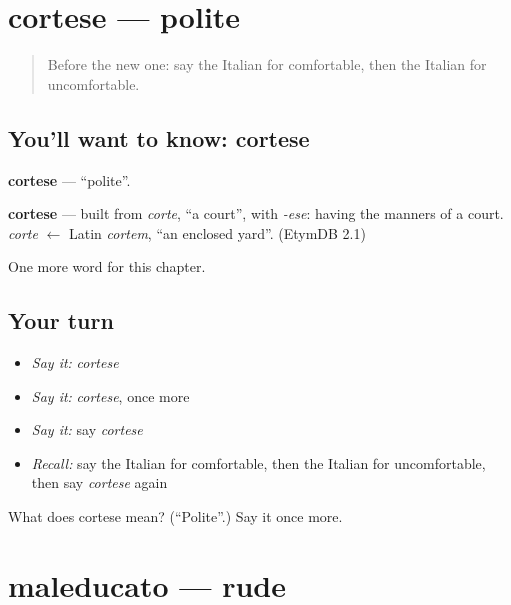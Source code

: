 \section[cortese]{cortese — polite}

\label{lesson:IT-C156-cortese}



\begin{quote}
Before the new one: say the Italian for comfortable, then the Italian for uncomfortable.
\end{quote}

\subsection*{You'll want to know: cortese}
\textbf{cortese} — \textquotedblleft{}polite\textquotedblright{}.

\begin{cousinweb}
\textbf{cortese} — built from \emph{corte}, \textquotedblleft{}a court\textquotedblright{}, with \emph{-ese}: having the manners of a court. \emph{corte} $\leftarrow$ Latin \emph{cortem}, \textquotedblleft{}an enclosed yard\textquotedblright{}. (EtymDB 2.1)
\end{cousinweb}

\begin{grammarlens}[title={What you've built}]
One more word for this chapter.
\end{grammarlens}

\subsection*{Your turn}
\begin{itemize}
\raggedright
  \item \emph{Say it:} \emph{cortese}
  \item \emph{Say it:} \emph{cortese}, once more
  \item \emph{Say it:} say \emph{cortese}
  \item \emph{Recall:} say the Italian for comfortable, then the Italian for uncomfortable, then say \emph{cortese} again
\end{itemize}

\begin{tcolorbox}[breakable,colback=teal!4,colframe=teal!35!black,title={Before you move on}]
What does cortese mean? (\textquotedblleft{}Polite\textquotedblright{}.) Say it once more.
\end{tcolorbox}
\section[maleducato]{maleducato — rude}

